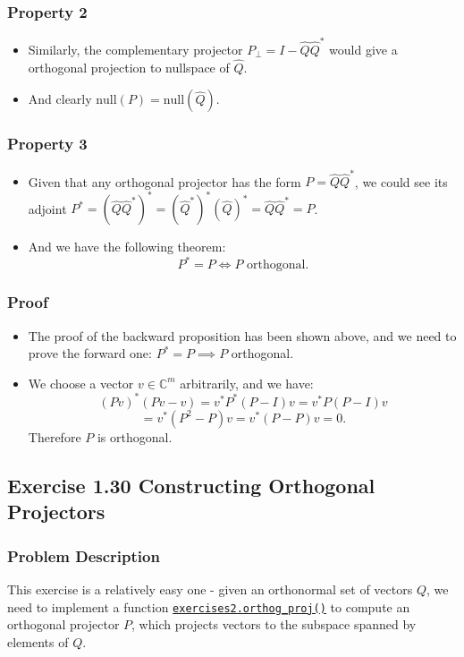 \subsubsection*{Property 2}%
\begin{itemize}
\item Similarly, the complementary projector $P_{\bot} = I - \hat{Q}\hat{Q}^*$ would give a orthogonal projection to nullspace of $\hat{Q}$.
\item And clearly $\text{null}(P) = \text{null}(\hat{Q})$.
\end{itemize}
\subsubsection*{Property 3}%
\begin{itemize}
  \item Given that any orthogonal projector has the form $P = \hat{Q}\hat{Q}^*$, we could see its adjoint $P^* = (\hat{Q}\hat{Q}^*)^* = (\hat{Q}^*)^*(\hat{Q})^* = \hat{Q}\hat{Q}^* = P$. 
  \item And we have the following theorem:
    \[
    P^* = P \iff P  \text{ orthogonal}
    .\] 
\end{itemize}
\subsubsection*{Proof}%
\begin{itemize}
\item The proof of the backward proposition has been shown above, and we need to prove the forward one: $P^* = P \implies P$ orthogonal.
\item We choose a vector $v \in \mathbb{C}^{m}$ arbitrarily, and we have:
  \[
    (Pv)^{*}(Pv - v) = v^*P^*(P - I)v = v^*P(P - I)v 
  \]
  \[
  = v^*(P^2 - P)v = v^*(P - P)v = 0 
  .\] 
  Therefore $P$ is orthogonal.
\end{itemize}

\subsection*{Exercise 1.30 Constructing Orthogonal Projectors}
\subsubsection*{Problem Description}%
This exercise is a relatively easy one - given an orthonormal set of vectors $Q$, we need to implement a function \href{https://comp-lin-alg.github.io/cla_utils.html#cla_utils.exercises2.orthog_proj}{\texttt{exercises2.orthog\_proj()}} to compute an orthogonal projector $P$, which projects vectors to the subspace spanned by elements of  $Q$.
